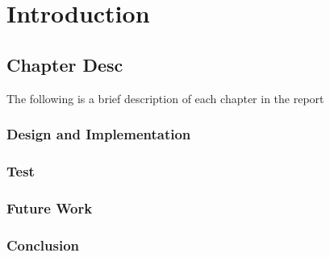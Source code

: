 \chapter{Introduction}
\label{chap:intro}





\section{Chapter Desc}
The following is a brief description of each chapter in the report

\subsection{Design and Implementation}
\subsection{Test}
\subsection{Future Work}
\subsection{Conclusion}
